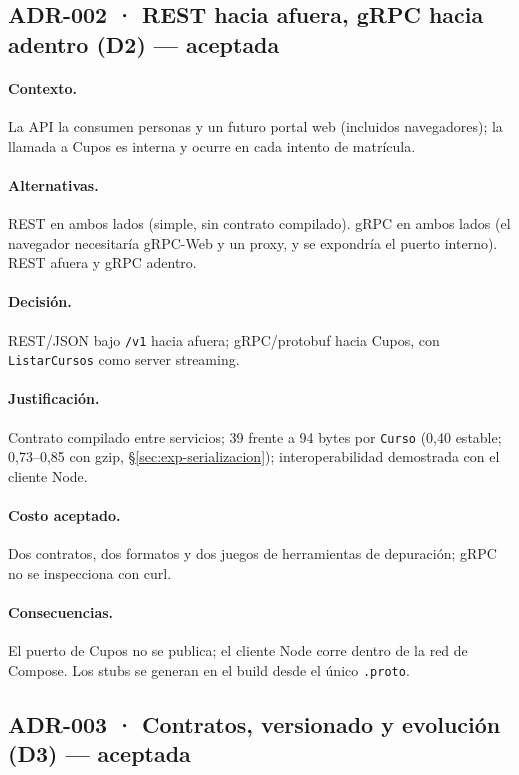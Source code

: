 \documentclass[11pt,spanish]{article}
\begin{document}
\subsection*{ADR-002 · REST hacia afuera, gRPC hacia adentro (D2) — aceptada}

\paragraph{Contexto.} La API la consumen personas y un futuro portal web (incluidos navegadores); la llamada a Cupos es interna y ocurre en cada intento de matrícula.

\paragraph{Alternativas.} REST en ambos lados (simple, sin contrato compilado). gRPC en ambos lados (el navegador necesitaría gRPC-Web y un proxy, y se expondría el puerto interno). REST afuera y gRPC adentro.

\paragraph{Decisión.} REST/JSON bajo \texttt{/v1} hacia afuera; gRPC/protobuf hacia Cupos, con \texttt{ListarCursos} como server streaming.

\paragraph{Justificación.} Contrato compilado entre servicios; 39 frente a 94 bytes por \texttt{Curso} (0,40 estable; 0,73--0,85 con gzip, \S\ref{sec:exp-serializacion}); interoperabilidad demostrada con el cliente Node.

\paragraph{Costo aceptado.} Dos contratos, dos formatos y dos juegos de herramientas de depuración; gRPC no se inspecciona con curl.

\paragraph{Consecuencias.} El puerto de Cupos no se publica; el cliente Node corre dentro de la red de Compose. Los stubs se generan en el build desde el único \texttt{.proto}.

\subsection*{ADR-003 · Contratos, versionado y evolución (D3) — aceptada}
\end{document}
